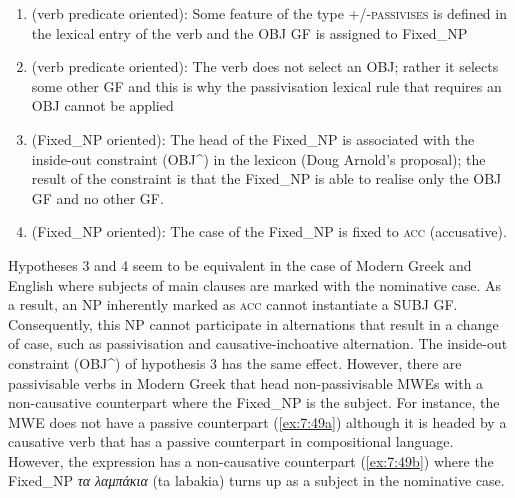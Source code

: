 \documentclass[output=paper]{langsci/langscibook}
\begin{document}
\begin{enumerate}
\item  (verb predicate oriented): Some feature of the type \textsc{+/-passivises} is defined in the lexical entry of the verb and the OBJ GF is assigned to Fixed\_NP
\item (verb predicate oriented): The verb does not select an OBJ; rather it selects some other GF and this is why the passivisation lexical rule that requires an OBJ cannot be applied
\item (Fixed\_NP oriented): The head of the Fixed\_NP is associated with the inside-out constraint (OBJ\^{}) in the lexicon (Doug Arnold's proposal); the result of the constraint is that the Fixed\_NP is able to realise only the OBJ GF and no other GF. 
\item (Fixed\_NP oriented): The case of the Fixed\_NP  is fixed to \textsc{acc} (accusative).
\end{enumerate}

Hypotheses 3 and 4 seem to be equivalent in the case of Modern Greek and English where subjects of main clauses are marked with the nominative case. As a result, an NP inherently marked as \textsc{acc}  cannot instantiate a SUBJ GF. Consequently, this NP cannot participate in alternations that result in a change of case, such as  passivisation and causative-inchoative alternation. The inside-out constraint (OBJ\^{}) of hypothesis 3 has the same effect. However, there are  passivisable verbs in Modern Greek that head non-passivisable MWEs with a non-causative counterpart where the Fixed\_NP  is the subject. For instance, the MWE   does not have a passive counterpart (\ref{ex:7:49a}) although it is headed by a causative verb that has a passive counterpart in compositional language. However, the expression has a non-causative counterpart (\ref{ex:7:49b}) where the Fixed\_NP \textit{τα λαμπάκια} (ta labakia) turns up as a subject in the nominative case. 


\ea%
\label{ex:7:49}
\z
\z
\end{document}
